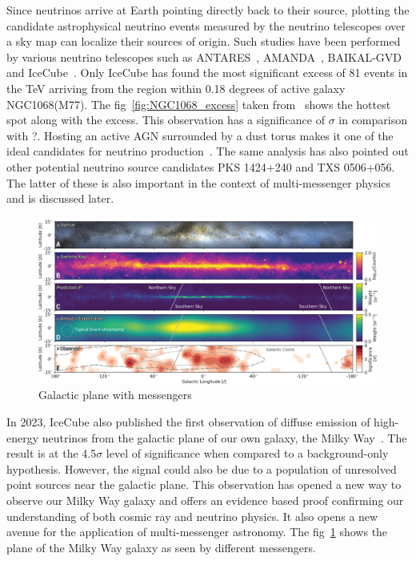   Since neutrinos arrive at Earth pointing directly back to their source, plotting the candidate astrophysical neutrino events measured by the neutrino telescopes over a sky map can localize their sources of origin. Such studies have been performed by various neutrino telescopes such as ANTARES~\cite{Albert_2021}, AMANDA~\cite{Abbasi_2009_Amanda}, BAIKAL-GVD~\cite{Allakhverdyan_2023} and IceCube~\cite{Icecube_2022}. Only IceCube has found the most significant excess of 81 events in the TeV arriving from the region within 0.18 degrees of active galaxy NGC1068(M77). The fig~\ref{fig:NGC1068_excess} taken from~\cite{Icecube_2022} shows the hottest spot along with the excess. This observation has a significance of $\sigma$ in comparison with ?. Hosting an active AGN surrounded by a dust torus makes it one of the ideal candidates for neutrino production~\cite{eichler1979high,berezinsky1981high}. The same analysis has also pointed out other potential neutrino source candidates PKS 1424+240 and TXS 0506+056. The latter of these is also important in the context of multi-messenger physics and is discussed later. 

  \begin{figure}[t!]
    \centering
    \includegraphics[width=14.5cm]{thesis_figures/CRnNu/science.adc9818-f1.jpg}
    \caption{Galactic plane with messengers~\cite{Galactic_plane_nu_2023}}
    \label{fig:Galactic_plane_nu_messengers}
  \end{figure}

  In 2023, IceCube also published the first observation of diffuse emission of high-energy neutrinos from the galactic plane of our own galaxy, the Milky Way~\cite{Galactic_plane_nu_2023}. The result is at the 4.5$\sigma$ level of significance when compared to a background-only hypothesis. However, the signal could also be due to a population of unresolved point sources near the galactic plane. This observation has opened a new way to observe our Milky Way galaxy and offers an evidence based proof confirming our understanding of both cosmic ray and neutrino physics. It also opens a new avenue for the application of multi-messenger astronomy. The fig~\ref{fig:Galactic_plane_nu_messengers} shows the plane of the Milky Way galaxy as seen by different messengers.
  
